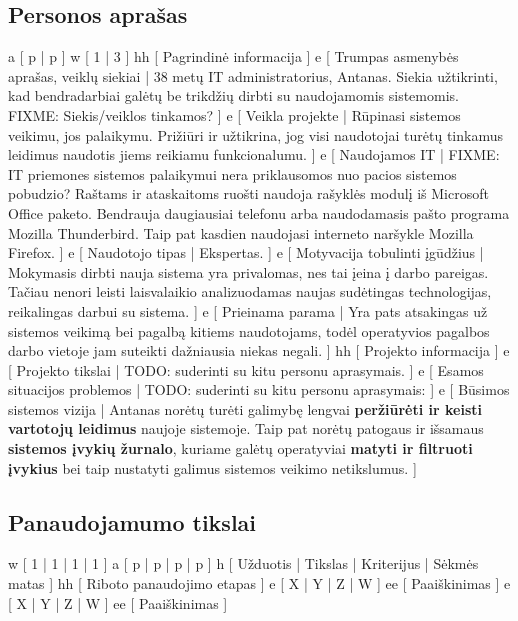 \subsection{Personos aprašas}
\xtableu
{
  a [ p | p ]
  w [ 1 | 3 ]
  hh [ Pagrindinė informacija ]
  e [ Trumpas asmenybės aprašas, veiklų siekiai
  |
    38 metų IT administratorius, Antanas. Siekia užtikrinti, kad bendradarbiai
    galėtų be trikdžių dirbti su naudojamomis sistemomis.
    FIXME: Siekis/veiklos tinkamos?
  ]
  e [ Veikla projekte
  |
    Rūpinasi sistemos veikimu, jos palaikymu. Prižiūri ir užtikrina, jog visi naudotojai
    turėtų tinkamus leidimus naudotis jiems reikiamu funkcionalumu.
  ]
  e [ Naudojamos IT
  |
    FIXME: IT priemones sistemos palaikymui nera priklausomos nuo pacios sistemos pobudzio?
    Raštams ir ataskaitoms ruošti naudoja rašyklės modulį iš Microsoft Office paketo.
    Bendrauja daugiausiai telefonu arba naudodamasis pašto
    programa Mozilla Thunderbird. Taip pat kasdien naudojasi interneto naršykle Mozilla Firefox.
  ]
  e [ Naudotojo tipas
  |
    Ekspertas.
  ]
  e [ Motyvacija tobulinti įgūdžius
  |
    Mokymasis dirbti nauja sistema yra privalomas, nes tai įeina į darbo pareigas. Tačiau nenori
    leisti laisvalaikio analizuodamas naujas sudėtingas technologijas, reikalingas darbui su sistema.
  ]
  e [ Prieinama parama
  |
    Yra pats atsakingas už sistemos veikimą bei pagalbą kitiems naudotojams, todėl operatyvios pagalbos
    darbo vietoje jam suteikti dažniausia niekas negali.
  ]
  hh [ Projekto informacija ]
  e [ Projekto tikslai
  |
    TODO: suderinti su kitu personu aprasymais.
  ]
  e [ Esamos situacijos problemos
  |
    TODO: suderinti su kitu personu aprasymais:
  ]
  e [ Būsimos sistemos vizija
  |
    Antanas norėtų turėti galimybę lengvai \textbf{peržiūrėti ir keisti vartotojų leidimus} naujoje sistemoje.
    Taip pat norėtų patogaus ir išsamaus \textbf{sistemos įvykių žurnalo}, kuriame galėtų operatyviai
    \textbf{matyti ir filtruoti įvykius} bei taip nustatyti galimus sistemos veikimo netikslumus.
  ]
}

\subsection{Panaudojamumo tikslai}
\xtable
{
  w [ 1 | 1 | 1 | 1 ]
  a [ p | p | p | p ]
  h [ Užduotis | Tikslas | Kriterijus | Sėkmės matas ]
  hh [ Riboto panaudojimo etapas ]
  e [ X | Y | Z | W ]
  ee [ Paaiškinimas ]
  e [ X | Y | Z | W ]
  ee [ Paaiškinimas ]
}
